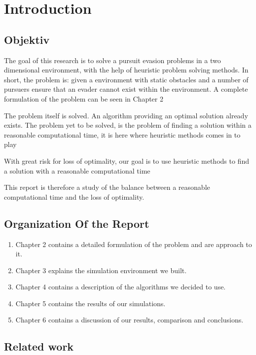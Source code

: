 \chapter{Introduction}

\section{Objektiv}

The goal of this research is to solve a pursuit evasion problems in a two dimensional environment, with the help of heuristic problem solving methods.
In short, the problem is: given a environment with static obstacles and a number of pursuers ensure that an evader cannot exist within the environment. A complete formulation of the problem can be seen in Chapter 2

The problem itself is solved. An algorithm providing an optimal solution already exists.
The problem yet to be solved, is the problem of finding a solution within a reasonable computational time, it is here where heuristic methods comes in to play

With great risk for loss of optimality, our goal is to use heuristic methods to find a solution with a reasonable computational time
 
This report is therefore a study of the balance between a reasonable computational time and the loss of optimality.

\section{Organization Of the Report}
\begin{enumerate}
\item Chapter 2 contains a detailed formulation of the problem and are approach to it.
\item Chapter 3 explains the simulation environment we built.
\item Chapter 4 contains a description of the algorithms we decided to use.
\item Chapter 5 contains the results of our simulations.
\item Chapter 6 contains a discussion of our results, comparison and conclusions.
\end{enumerate}

\section{ Related work}

